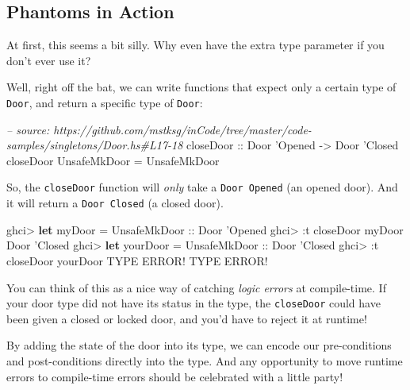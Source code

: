 \documentclass[]{article}
\newenvironment{Shaded}{}{}
\newcommand{\KeywordTok}[1]{\textcolor[rgb]{0.00,0.44,0.13}{\textbf{#1}}}
\newcommand{\DataTypeTok}[1]{\textcolor[rgb]{0.56,0.13,0.00}{#1}}
\newcommand{\CharTok}[1]{\textcolor[rgb]{0.25,0.44,0.63}{#1}}
\newcommand{\CommentTok}[1]{\textcolor[rgb]{0.38,0.63,0.69}{\textit{#1}}}
\newcommand{\OtherTok}[1]{\textcolor[rgb]{0.00,0.44,0.13}{#1}}
\newcommand{\FunctionTok}[1]{\textcolor[rgb]{0.02,0.16,0.49}{#1}}
\newcommand{\NormalTok}[1]{#1}
\begin{document}
\subsection{Phantoms in Action}\label{phantoms-in-action}

At first, this seems a bit silly. Why even have the extra type parameter if you
don't ever use it?

Well, right off the bat, we can write functions that expect only a certain type
of \texttt{Door}, and return a specific type of \texttt{Door}:

\begin{Shaded}
\begin{Highlighting}[]
\CommentTok{-- source: https://github.com/mstksg/inCode/tree/master/code-samples/singletons/Door.hs#L17-18}
\OtherTok{closeDoor ::} \DataTypeTok{Door} \CharTok{'Opened -> Door '}\DataTypeTok{Closed}
\NormalTok{closeDoor }\DataTypeTok{UnsafeMkDoor} \FunctionTok{=} \DataTypeTok{UnsafeMkDoor}
\end{Highlighting}
\end{Shaded}

So, the \texttt{closeDoor} function will \emph{only} take a
\texttt{Door\ \textquotesingle{}Opened} (an opened door). And it will return a
\texttt{Door\ \textquotesingle{}Closed} (a closed door).

\begin{Shaded}
\begin{Highlighting}[]
\NormalTok{ghci}\FunctionTok{>} \KeywordTok{let}\NormalTok{ myDoor }\FunctionTok{=} \DataTypeTok{UnsafeMkDoor}\OtherTok{ ::} \DataTypeTok{Door} \CharTok{'Opened}
\NormalTok{ghci}\FunctionTok{>} \FunctionTok{:}\NormalTok{t closeDoor myDoor}
\DataTypeTok{Door} \CharTok{'Closed}
\NormalTok{ghci}\FunctionTok{>} \KeywordTok{let}\NormalTok{ yourDoor }\FunctionTok{=} \DataTypeTok{UnsafeMkDoor}\OtherTok{ ::} \DataTypeTok{Door} \CharTok{'Closed}
\NormalTok{ghci}\FunctionTok{>} \FunctionTok{:}\NormalTok{t closeDoor yourDoor}
\DataTypeTok{TYPE} \DataTypeTok{ERROR}\FunctionTok{!}  \DataTypeTok{TYPE} \DataTypeTok{ERROR}\FunctionTok{!}
\end{Highlighting}
\end{Shaded}

You can think of this as a nice way of catching \emph{logic errors} at
compile-time. If your door type did not have its status in the type, the
\texttt{closeDoor} could have been given a closed or locked door, and you'd have
to reject it at runtime!

By adding the state of the door into its type, we can encode our pre-conditions
and post-conditions directly into the type. And any opportunity to move runtime
errors to compile-time errors should be celebrated with a little party!
\end{document}
